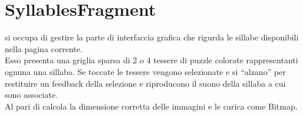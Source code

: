 \section{SyllablesFragment}
\label{sec:syllables_fragment}

 si occupa di gestire la parte di interfaccia grafica che rigurda le sillabe disponibili nella pagina corrente.\\
Esso presenta una griglia sparsa di 2 o 4 tessere di puzzle colorate rappresentanti ognuna una sillaba. Se toccate le tessere vengono selezionate e si ``alzano'' per restituire un feedback della selezione e riproducono il suono della sillaba a cui sono associate.\\
Al pari di  calcola la dimensione corretta delle immagini e le carica come Bitmap.